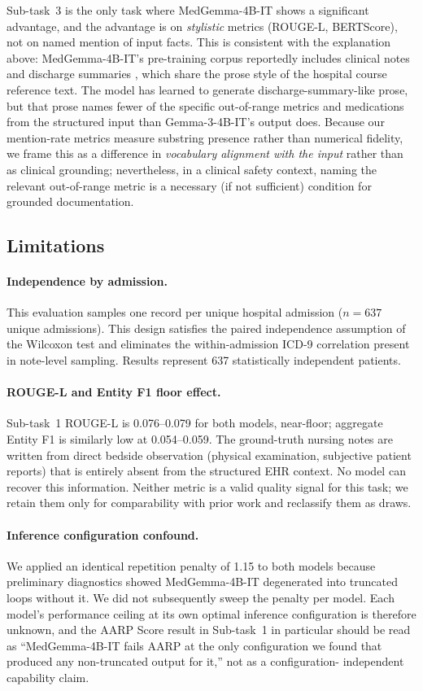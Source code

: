 \documentclass[sigconf,anonymous=false,review=false]{acmart}
\newcommand{\medgemma}{MedGemma-4B-IT\xspace}
\newcommand{\gemma}{Gemma-3-4B-IT\xspace}
\begin{document}
Sub-task~3 is the only task where \medgemma shows a significant advantage,
and the advantage is on \emph{stylistic} metrics (ROUGE-L, BERTScore), not on
named mention of input facts. This is consistent with the explanation above:
\medgemma's pre-training corpus reportedly includes clinical notes and
discharge summaries \cite{medgemma2025}, which share the prose style of the
hospital course reference text. The model has learned to generate
discharge-summary-like prose, but that prose names fewer of the specific
out-of-range metrics and medications from the structured input than \gemma's
output does. Because our mention-rate metrics measure substring presence
rather than numerical fidelity, we frame this as a difference in
\emph{vocabulary alignment with the input} rather than as clinical grounding;
nevertheless, in a clinical safety context, naming the relevant out-of-range
metric is a necessary (if not sufficient) condition for grounded
documentation.

\subsection{Limitations}
\label{sec:limits}

\paragraph{Independence by admission.}
This evaluation samples one record per unique hospital admission ($n = 637$
unique admissions). This design satisfies the paired independence assumption
of the Wilcoxon test and eliminates the within-admission ICD-9 correlation
present in note-level sampling. Results represent 637 statistically independent
patients.

\paragraph{ROUGE-L and Entity F1 floor effect.}
Sub-task~1 ROUGE-L is 0.076--0.079 for both models, near-floor; aggregate
Entity F1 is similarly low at 0.054--0.059.
The ground-truth nursing notes are written from direct bedside observation
(physical examination, subjective patient reports) that is entirely absent
from the structured EHR context. No model can recover this information.
Neither metric is a valid quality signal for this task; we retain them only
for comparability with prior work and reclassify them as draws.

\paragraph{Inference configuration confound.}
We applied an identical repetition penalty of 1.15 to both models because
preliminary diagnostics showed \medgemma degenerated into truncated loops
without it. We did not subsequently sweep the penalty per model. Each
model's performance ceiling at its own optimal inference configuration is
therefore unknown, and the AARP Score result in Sub-task~1 in particular
should be read as ``\medgemma fails AARP at the only configuration we found
that produced any non-truncated output for it,'' not as a configuration-
independent capability claim.
\end{document}
